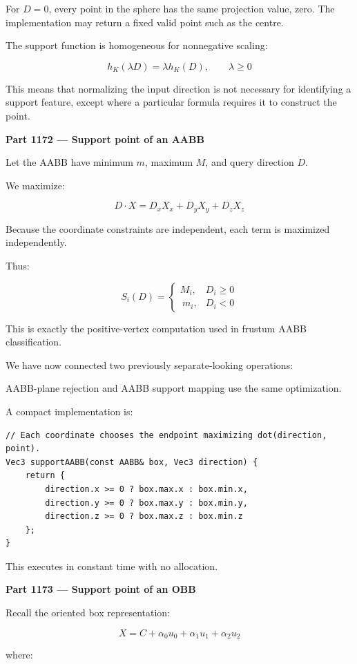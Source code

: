 For \(D=0\), every point in the sphere has the same projection value, zero. The implementation may return a fixed valid point such as the centre.

The support function is homogeneous for nonnegative scaling:

\[
h_K(\lambda D)=\lambda h_K(D),\qquad\lambda\ge0
\]

This means that normalizing the input direction is not necessary for identifying a support feature, except where a particular formula requires it to construct the point.

\textbf{Part 1172 --- Support point of an AABB}

Let the AABB have minimum \(m\), maximum \(M\), and query direction \(D\).

We maximize:

\[
D\cdot X=D_xX_x+D_yX_y+D_zX_z
\]

Because the coordinate constraints are independent, each term is maximized independently.

Thus:

\[
\boxed{ S_i(D)= \begin{cases} M_i,&D_i\ge0\\\ m_i,&D_i<0 \end{cases} }
\]

This is exactly the positive-vertex computation used in frustum AABB classification.

We have now connected two previously separate-looking operations:

AABB-plane rejection and AABB support mapping use the same optimization.

A compact implementation is:

\begin{verbatim}
// Each coordinate chooses the endpoint maximizing dot(direction, point).
Vec3 supportAABB(const AABB& box, Vec3 direction) {
    return {
        direction.x >= 0 ? box.max.x : box.min.x,
        direction.y >= 0 ? box.max.y : box.min.y,
        direction.z >= 0 ? box.max.z : box.min.z
    };
}
\end{verbatim}

This executes in constant time with no allocation.

\textbf{Part 1173 --- Support point of an OBB}

Recall the oriented box representation:

\[
X=C+\alpha_0u_0+\alpha_1u_1+\alpha_2u_2
\]

where:

